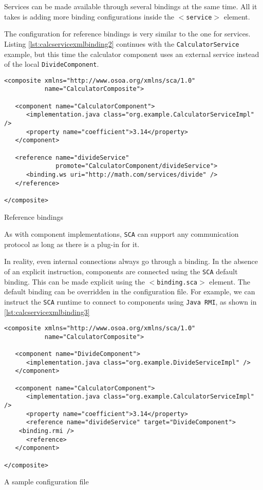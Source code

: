 Services can be made available through several bindings at the same time. All it takes is adding more binding configurations
inside the \texttt{$<$service$>$} element.

The configuration for reference bindings is very similar to the one for services. Listing \ref{lst:calcservicexmlbinding2}
continues with the \texttt{CalculatorService} example, but this time the calculator component uses an external service
instead of the local \texttt{DivideComponent}.

\begin{listing}[!htbp]
\begin{verbatim}
<composite xmlns="http://www.osoa.org/xmlns/sca/1.0"
           name="CalculatorComposite">

   <component name="CalculatorComponent">
      <implementation.java class="org.example.CalculatorServiceImpl" />
      <property name="coefficient">3.14</property>
   </component>
   
   <reference name="divideService"
              promote="CalculatorComponent/divideService">
      <binding.ws uri="http://math.com/services/divide" />
   </reference>
   
</composite>
\end{verbatim}
\caption{Reference bindings}
\label{lst:calcservicexmlbinding2}
\end{listing}

As with component implementations, \texttt{SCA} can support any communication protocol as long as there is a plug-in for it.

In reality, even internal connections always go through a binding. In the absence of an explicit instruction, components
are connected using the \texttt{SCA} default binding. This can be made explicit using the \texttt{$<$binding.sca$>$} element.
The default binding can be overridden in the configuration file. For example, we can instruct the \texttt{SCA} runtime to
connect to components using \texttt{Java RMI}, as shown in \ref{lst:calcservicexmlbinding3}

\begin{listing}[!htbp]
\begin{verbatim}
<composite xmlns="http://www.osoa.org/xmlns/sca/1.0"
           name="CalculatorComposite">

   <component name="DivideComponent">
      <implementation.java class="org.example.DivideServiceImpl" />
   </component>

   <component name="CalculatorComponent">
      <implementation.java class="org.example.CalculatorServiceImpl" />
      <property name="coefficient">3.14</property>
      <reference name="divideService" target="DivideComponent">
	<binding.rmi />
      <reference>
   </component>

</composite>
\end{verbatim}
\caption{A sample configuration file}
\label{lst:calcservicexmlbinding3}
\end{listing}

